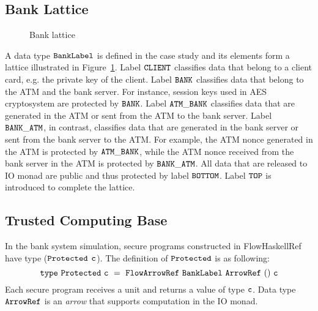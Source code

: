\documentclass{report}
\newcommand{\co}[1]{$\cod{#1}$}
\begin{document}
\subsection{Bank Lattice}
\begin{figure}[t]



\caption{Bank lattice}
\label{fig:banklattice}
\end{figure}
A data type \co{BankLabel} is defined in the case study and its elements form a lattice illustrated 
in Figure~\ref{fig:banklattice}.
Label \co{CLIENT} classifies data that belong to a client card, e.g. the private key of the client.
Label \co{BANK} classifies data that belong to the ATM and the bank server. For instance, session keys used in
AES cryptosystem are
protected by \co{BANK}. Label \co{ATM\_BANK} classifies data that are generated in the ATM or sent from the ATM
to the bank server. Label \co{BANK\_ATM}, in contrast, classifies data that are generated in the bank server or
sent from the bank server to the ATM.
For example, the ATM nonce generated in the ATM is protected by \co{ATM\_BANK},
while the ATM nonce received from the bank server in the ATM is protected by \co{BANK\_ATM}. 
All data that are released to IO monad are public and thus protected by label \co{BOTTOM}.
Label \co{TOP} is introduced to complete the lattice.

\subsection{Trusted Computing Base}
\label{chap6:banksystem:tcb}
In the bank system simulation, secure programs constructed in FlowHaskellRef have type (\co{Protected} \co{c}).
The definition of \co{Protected} is as following:
\[
\mathtt{type}~\mathtt{Protected}~\mathtt{c}~=~\mathtt{FlowArrowRef}~\mathtt{BankLabel}~\mathtt{ArrowRef}~()~\mathtt{c}
\]
Each secure program receives a unit and returns a value of type \co{c}. Data type \co{ArrowRef} is an {\em arrow}
that supports computation in the IO monad.
\end{document}
